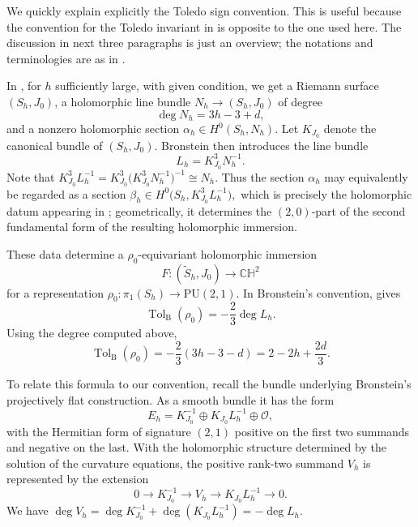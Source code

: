 \documentclass[12pt]{amsart}
\theoremstyle{remark}
\newcommand{\CH}{\mathbb{CH}}
\newcommand{\PU}{\mathrm{PU}}
\begin{document}
We quickly explain explicitly the Toledo sign convention.  This is useful
because the convention for the Toledo invariant in \cite{BronsteinPU} is
opposite to the one used here. The discussion in next three paragraphs is just an overview; the notations and terminologies are as in \cite{BronsteinPU}. 

In \cite[Theorem~5.2]{BronsteinPU}, for $h$ sufficiently large,  with given condition, we get a Riemann surface
$(S_h,J_0)$, a holomorphic line bundle $N_h\to (S_h,J_0)$ of degree
\[
    \deg N_h=3h-3+d,
\]
and a nonzero holomorphic section
\(\alpha_h\in H^0(S_h,N_h).
\) Let $K_{J_0}$ denote the canonical bundle of $(S_h,J_0)$.  Bronstein then
introduces the line bundle
\[
    L_h=K_{J_0}^{3}N_h^{-1}.
\]
Note that 
\(K_{J_0}^{3}L_h^{-1}
    =K_{J_0}^{3}\bigl(K_{J_0}^{3}N_h^{-1}\bigr)^{-1}
    \cong N_h.
\)
Thus the section $\alpha_h$ may equivalently be regarded as a section
\(\beta_h\in H^0\bigl(S_h,K_{J_0}^{3}L_h^{-1}\bigr),
\)
which is precisely the holomorphic datum appearing in
\cite[Theorem~3.7]{BronsteinPU}; geometrically, it determines the
$(2,0)$-part of the second fundamental form of the resulting holomorphic
immersion.

\smallskip 

These data determine a
$\rho_0$-equivariant holomorphic immersion
\[
    F:(\widetilde S_h,J_0)\longrightarrow\CH^2
\]
for a representation
\(
    \rho_0:\pi_1(S_h)\longrightarrow\PU(2,1).
\)  In Bronstein's convention,
\cite[equation~(3.5)]{BronsteinPU} gives
\[
    \operatorname{Tol}_{\mathrm B}(\rho_0)
    =-\frac23\deg L_h.
\]
Using the degree computed above,
\[
    \operatorname{Tol}_{\mathrm B}(\rho_0)
    =-\frac23(3h-3-d)
    =2-2h+\frac{2d}{3}.
\]

To relate this formula to our convention, recall the bundle underlying
Bronstein's projectively flat construction.  As a smooth bundle it has the
form
\[
    E_h=K_{J_0}^{-1}\oplus K_{J_0}L_h^{-1}\oplus\mathcal O,
\]
with the Hermitian form of signature $(2,1)$ positive on the first two
summands and negative on the last.  With the holomorphic structure determined
by the solution of the curvature equations, the positive rank-two summand
$V_h$ is represented by the extension
\begin{equation}\label{eq:bronstein-extension}
    0\longrightarrow K_{J_0}^{-1}
    \longrightarrow V_h
    \longrightarrow K_{J_0}L_h^{-1}
    \longrightarrow0.
\end{equation}
We have 
\( \deg V_h =\deg K_{J_0}^{-1}
      +\deg(K_{J_0}L_h^{-1}) =-\deg L_h.
\)
\end{document}
